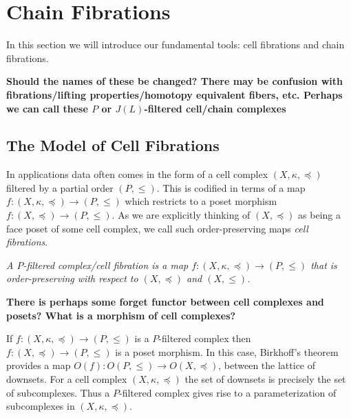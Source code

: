 \section{Chain Fibrations}\label{sec:cf}

In this section we will introduce our fundamental tools: cell fibrations and chain fibrations.


 {\bf Should the names of these be changed?  There may be confusion with fibrations/lifting properties/homotopy equivalent fibers, etc.  Perhaps we can call these $P$ or $J(L)$-filtered cell/chain complexes}


\subsection{The Model of Cell Fibrations}

In applications data often comes in the form of a cell complex $(X,\kappa,\preceq)$ filtered by a partial order $(P,\leq)$.  This is codified in terms of a map $f:(X,\kappa, \preceq)\to (P,\leq)$ which restricts to a poset morphism $f:(X,\preceq)\to (P,\leq)$. As we are explicitly thinking of $(X,\preceq)$ as being a face poset of some cell complex, we call such order-preserving maps {\em cell fibrations}.

\begin{defn}
{\em
A $P$-filtered complex/cell fibration is a map $f:(X,\kappa,\preceq)\to (P,\leq)$ that is order-preserving with respect to $(X,\preceq)$ and $(X,\leq)$.
}
\end{defn}

{\bf There is perhaps some forget functor between cell complexes and posets?  What is a morphism of cell complexes?}

\begin{rem}
If $f:(X,\kappa,\preceq)\to (P,\leq)$ is a $P$-filtered complex then $f:(X,\preceq)\to (P,\leq)$ is a poset morphism.  In this case, Birkhoff's theorem provides a map $O(f):O(P,\leq)\to O(X,\preceq)$, between the lattice of downsets.  For a cell complex $(X,\kappa,\preceq)$ the set of downsets is precisely the set of subcomplexes.   Thus a $P$-filtered complex gives rise to a parameterization of subcomplexes in $(X,\kappa,\preceq)$.
\end{rem}


